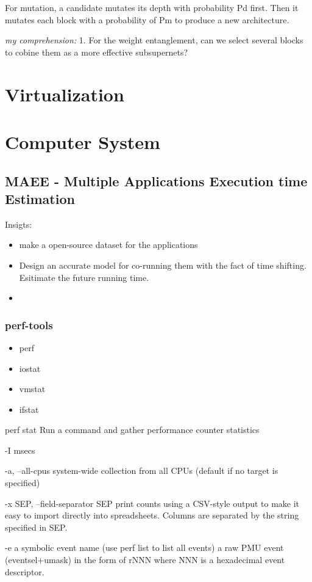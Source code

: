 \documentclass[UTF8]{article}
\begin{document}
For mutation, a candidate mutates its depth with probability Pd first. Then it mutates each block with a probability of Pm to produce a new architecture.

\emph{my comprehension:} 1. For the weight entanglement, can we select several blocks to cobine them as a more effective subsupernets? 

\section{Virtualization}
\section{Computer System}
\subsection{MAEE - Multiple Applications Execution time Estimation}
Insigts:

\begin{itemize}
	\item make a open-source dataset for the applications 
	\item Design an accurate model for co-running them with the fact of time shifting. Esitimate the future running time.
	\item 
\end{itemize}



\subsubsection{perf-tools}
\begin{itemize}
	\item perf
	\item iostat
	\item vmstat
	\item ifstat
\end{itemize}

perf stat Run a command and gather performance counter statistics

-I msecs

-a, --all-cpus system-wide collection from all CPUs (default if no target is
specified)

-x SEP, --field-separator SEP
print counts using a CSV-style output to make it easy to import directly into spreadsheets. Columns are
separated by the string specified in SEP.


-e a symbolic event name (use perf list to list all events) a raw PMU event (eventsel+umask) in the form of rNNN where NNN
is a hexadecimal event descriptor.
\end{document}
